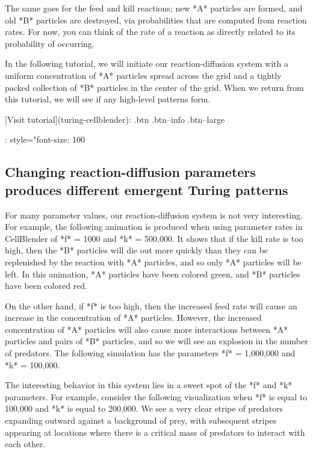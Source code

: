 {\begin{qbox}\end{qbox}

The same goes for the feed and kill reactions; new *A* particles are formed, and old *B* particles are destroyed, via probabilities that are computed from reaction rates. For now, you can think of the rate of a reaction as directly related to its probability of occurring.

In the following tutorial, we will initiate our reaction-diffusion system with a uniform concentration of *A* particles spread across the grid and a tightly packed collection of *B* particles in the center of the grid. When we return from this tutorial, we will see if any high-level patterns form.

[Visit tutorial](turing-cellblender){: .btn .btn--info .btn--large}
{: style="font-size: 100%

\FloatBarrier
{}
\subsection{Changing reaction-diffusion parameters produces different emergent Turing patterns}

For many parameter values, our reaction-diffusion system is not very interesting.  For example, the following animation is produced when using parameter rates in CellBlender of *f* = 1000 and *k* = 500,000.  It shows that if the kill rate is too high, then the *B* particles will die out more quickly than they can be replenished by the reaction with *A* particles, and so only *A* particles will be left. In this animation, *A* particles have been colored green, and *B* particles have been colored red.

{%

On the other hand, if *f* is too high, then the increased feed rate will cause an increase in the concentration of *A* particles. However, the increased concentration of *A* particles will also cause more interactions between *A* particles and pairs of *B* particles, and so we will see an explosion in the number of predators. The following simulation has the parameters *f* = 1,000,000 and *k* = 100,000.

{%

The interesting behavior in this system lies in a sweet spot of the *f* and *k* parameters. For example, consider the following visualization when *f* is equal to 100,000 and *k* is equal to 200,000. We see a very clear stripe of predators expanding outward against a background of prey, with subsequent stripes appearing at locations where there is a critical mass of predators to interact with each other.

}}}}

